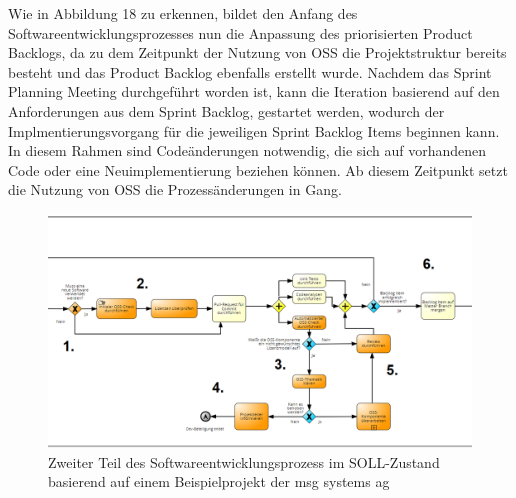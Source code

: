 Wie in Abbildung 18 zu erkennen, bildet den Anfang des Softwareentwicklungsprozesses nun die Anpassung des priorisierten Product Backlogs, da zu dem Zeitpunkt der Nutzung von OSS die Projektstruktur bereits besteht und das Product Backlog ebenfalls erstellt wurde. Nachdem das Sprint Planning Meeting durchgeführt worden ist, kann die Iteration basierend auf den Anforderungen aus dem Sprint Backlog, gestartet werden, wodurch der Implmentierungsvorgang für die jeweiligen Sprint Backlog Items beginnen kann. In diesem Rahmen sind Codeänderungen notwendig, die sich auf vorhandenen Code oder eine Neuimplementierung beziehen können. Ab diesem Zeitpunkt setzt die Nutzung von OSS die Prozessänderungen in Gang.

\begin{figure}[h]
    \centering
    \includegraphics[scale=0.5]{Bilder/SOLL-Prozess_second Partv2.png}
    \caption{Zweiter Teil des Softwareentwicklungsprozess im SOLL-Zustand basierend auf einem Beispielprojekt der msg systems ag}
\end{figure}

